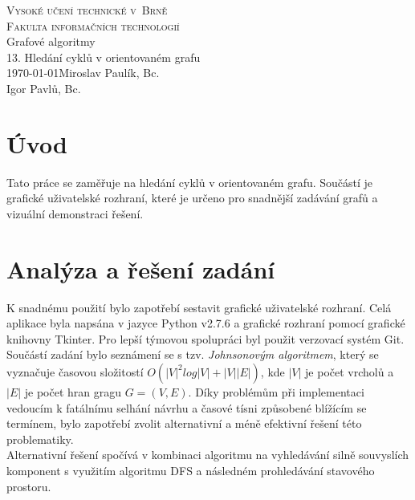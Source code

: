 \documentclass[11pt]{article}
\begin{document}
\begin{titlepage}
\begin{center}
\textsc{\Huge Vysoké učení technické v~Brně\\ 
\huge Fakulta informačních technologií}\\
\LARGE Grafové algoritmy\\
\Huge 13. Hledání cyklů v orientovaném grafu\\
\Large \today \hfill Miroslav Paulík, Bc.\\ \hfill Igor Pavlů, Bc.
\end{center}
\end{titlepage}
\tableofcontents
\newpage
\section{Úvod}
Tato práce se zaměřuje na hledání cyklů v orientovaném grafu. Součástí je grafické uživatelské rozhraní, které je určeno pro snadnější zadávání grafů a vizuální demonstraci řešení. \\
	
\section{Analýza a řešení zadání}
K snadnému použití bylo zapotřebí sestavit grafické uživatelské rozhraní. Celá aplikace byla napsána v jazyce Python v2.7.6\cite{python} a grafické rozhraní pomocí grafické knihovny Tkinter\cite{tkinter}. Pro lepší týmovou spolupráci byl použit verzovací systém Git.\\ 
Součástí zadání bylo seznámení se s tzv. \textit{Johnsonovým algoritmem}\cite{jonshon}, který se vyznačuje časovou složitostí $O(|V|^2log|V| + |V||E|)$, kde $|V|$ je počet vrcholů a $|E|$ je počet hran gragu $G = (V, E)$. Díky problémům při implementaci vedoucím k fatálnímu selhání návrhu a časové tísni způsobené blížícím se termínem, bylo zapotřebí zvolit alternativní a méně efektivní řešení této problematiky.\\
Alternativní řešení spočívá v kombinaci algoritmu na vyhledávání silně souvyslích komponent\cite{gal} s využitím algoritmu DFS a následném prohledávání stavového prostoru. \\
\end{document}
